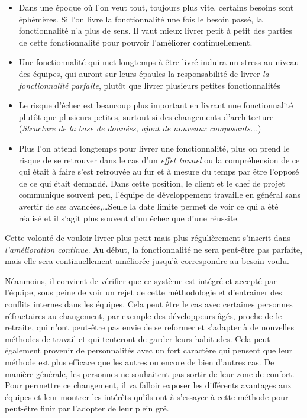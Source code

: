 \begin{itemize}
	\setlength\itemsep{0em}
	\item Dans une époque où l'on veut tout, toujours plus vite, certains besoins sont éphémères. Si l'on livre la fonctionnalité une fois le besoin passé, la fonctionnalité n'a plus de sens. Il vaut mieux livrer petit à petit des parties de cette fonctionnalité pour pouvoir l'améliorer continuellement.
	\item Une fonctionnalité qui met longtemps à être livré induira un stress au niveau des équipes, qui auront sur leurs épaules la responsabilité de livrer \emph{la fonctionnalité parfaite}, plutôt que livrer plusieurs petites fonctionnalités
	\item Le risque d'échec est beaucoup plus important en livrant une fonctionnalité plutôt que plusieurs petites, surtout si des changements d'architecture (\emph{Structure de la base de données, ajout de nouveaux composants...})
	\item Plus l'on attend longtemps pour livrer une fonctionnalité, plus on prend le risque de se retrouver dans le cas d'un \emph{effet tunnel} ou la compréhension de ce qui était à faire s'est retrouvée au fur et à mesure du temps par être l'opposé de ce qui était demandé. Dans cette position, le client et le chef de projet communique souvent peu, l'équipe de développement travaille en général sans avertir de ses avancées,\ldots Seule la date limite permet de voir ce qui a été réalisé et il s'agit plus souvent d'un échec que d'une réussite.
\end{itemize}

Cette volonté de vouloir livrer plus petit mais plus régulièrement s'inscrit dans \emph{l'amélioration continue}. Au début, la fonctionnalité ne sera peut-être pas parfaite, mais elle sera continuellement améliorée jusqu'à correspondre au besoin voulu.

Néanmoins, il convient de vérifier que ce système est intégré et accepté par l'équipe, sous peine de voir un rejet de cette méthodologie et d'entrainer des conflits internes dans les équipes. Cela peut être le cas avec certaines personnes réfractaires au changement, par exemple des développeurs âgés, proche de le retraite, qui n'ont peut-être pas envie de se reformer et s'adapter à de nouvelles méthodes de travail et qui tenteront de garder leurs habitudes. Cela peut également provenir de personnalités avec un fort caractère qui pensent que leur méthode est plus efficace que les autres ou encore de bien d'autres cas. De manière générale, les personnes ne souhaitent pas sortir de leur zone de confort. Pour permettre ce changement, il va falloir exposer les différents avantages aux équipes et leur montrer les intérêts qu'ils ont à s'essayer à cette méthode pour peut-être finir par l'adopter de leur plein gré.

